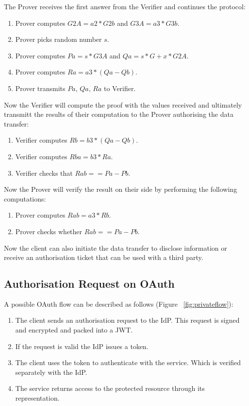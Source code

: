 The Prover receives the first answer from the Verifier and continues the protocol:
\begin{enumerate}
    \item Prover computes $G2A = a2 * G2b$ and $G3A = a3 * G3b$.
    \item Prover picks random number $s$.
    \item Prover computes $Pa = s * G3A$ and $Qa = s * G + x * G2A$.
    \item Prover computes $Ra = a3 * (Qa - Qb)$.
    \item Prover transmits $Pa$, $Qa$, $Ra$ to Verifier.
\end{enumerate}

Now the Verifier will compute the proof with the values received and ultimately transmitt the results of their computation to the Prover authorising the data transfer:
\begin{enumerate}
    \item Verifier computes $Rb = b3 * (Qa - Qb)$.
    \item Verifier computes $Rba = b3 * Ra$.
    \item Verifier checks that $Rab == Pa - Pb$.
\end{enumerate}

Now the Prover will verify the result on their side by performing the following computations:

\begin{enumerate}
    \item Prover computes $Rab = a3 * Rb$.
    \item Prover checks whether $Rab == Pa - Pb$.
\end{enumerate}

Now the client can also initiate the data transfer to disclose information or receive an authorisation ticket that can be used with a third party.

\subsection{Authorisation Request on OAuth}

A possible OAuth flow can be described as follows (Figure ~\ref{fig:privateflow}):
\begin{enumerate}
    \item The client sends an authorisation request to the IdP. This request is signed and encrypted and packed into a JWT.
    \item If the request is valid the IdP issues a token.
    \item The client uses the token to authenticate with the service. Which is verified separately with the IdP.
    \item The service returns access to the protected resource through its representation.
\end{enumerate}

